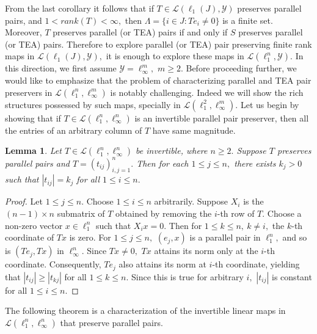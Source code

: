 \documentclass{amsart}
\newtheorem{lemma}[theorem]{Lemma}
\theoremstyle{definition}
\theoremstyle{remark}
\numberwithin{equation}{section}
\begin{document}
From the last corollary it follows that if $T\in \mathcal{L}(\ell_1(J),\mathcal{Y})$ preserves parallel pairs,  and $1<rank(T)<\infty,$ then $\Lambda=\{i\in J:Te_i\neq 0\}$ is a finite set.  Moreover, $T$ preserves parallel (or TEA) pairs if and only if $S$ preserves parallel (or TEA) pairs. Therefore to explore parallel (or TEA) pair preserving finite rank  maps in $\mathcal{L}(\ell_1(J),\mathcal{Y}),$ it is enough to explore these maps in $\mathcal{L}(\ell_1^n,\mathcal{Y}).$ In this direction, we first assume $\mathcal{Y}=\ell_\infty^m,$ $m\geq 2.$ Before proceeding further, we would like to emphasize that the problem of characterizing parallel and TEA pair preservers in $\mathcal{L}(\ell_1^n,\ell_\infty^m)$ is notably challenging. Indeed we will show the rich structures possessed by such maps, specially in $\mathcal{L}(\ell_1^2,\ell_\infty^m).$
Let us begin by showing that if $T\in \mathcal{L}(\ell_1^n,\ell_\infty^n)$ is an invertible parallel pair preserver, then all the entries of an arbitrary column of $T$ have same magnitude.
\begin{lemma}\label{lem-inv}
	Let	$T\in \mathcal{L}(\ell_1^n,\ell_\infty^n)$ be invertible, where $n\geq 2.$ Suppose $T$ preserves parallel pairs and $T=(t_{ij})_{i,j=1}^n.$ Then for each $1\leq j\leq n,$ there exists $k_j>0$ such that $|t_{ij}|=k_j$ for all $1\leq i\leq n.$
\end{lemma}
\begin{proof}
	Let $1\leq j\leq n.$ Choose $1\leq i\leq n$ arbitrarily. Suppose $X_i$ is the $(n-1)\times n$  submatrix of $T$ obtained by removing the $i$-th row of $T.$ Choose a non-zero vector $x\in \ell_1^n$ such that $X_ix=0.$ Then for $1\leq k\leq n, ~k\neq i,$ the $k$-th coordinate of  $Tx$ is zero. For $1\leq j\leq n,$ $(e_j,x)$ is a parallel pair in $\ell_1^n,$ and so is $(Te_j,Tx)$ in $\ell_\infty^n.$ Since $Tx\neq 0,$  $Tx$ attains its norm only at the $i$-th coordinate. Consequently, $Te_j$ also attains its norm at $i$-th coordinate, yielding that $|t_{ij}|\geq |t_{kj}|$ for all $1\leq k\leq n.$ Since this is true for arbitrary $i,$ $|t_{ij}|$ is constant for all $1\leq i\leq n .$ %
\end{proof}




The following theorem is a characterization of the invertible linear maps in $\mathcal{L}(\ell_1^n,\ell_\infty^n)$ that preserve parallel pairs.
\end{document}
